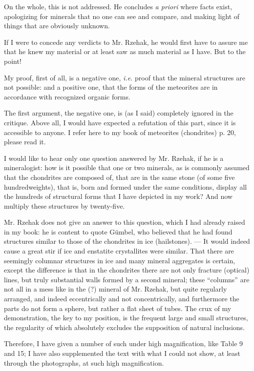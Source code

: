 \documentclass[a4paper, 12pt, oneside]{article}
\begin{document}
On the whole, this is not addressed. He concludes \emph{a priori} where facts exist, apologizing for minerals that no one can see and compare, and making light of things that are obviously unknown.

If I were to concede any verdicts to Mr. Rzehak, he would first have to assure me that he knew my material or at least saw as much material as I have. But to the point!

My proof, first of all, is a negative one, \emph{i.e.} proof that the mineral structures are not possible: and a positive one, that the forms of the meteorites are in accordance with recognized organic forms.

The first argument, the negative one, is (as I said) completely ignored in the critique. Above all, I would have expected a refutation of this part, since it is accessible to anyone. I refer here to my book of meteorites (chondrites) p. 20, please read it.

I would like to hear only one question answered by Mr. Rzehak, if he is a mineralogist: how is it possible that one or two minerals, as is commonly assumed that the chondrites are composed of, that are in the same stone (of some five hundredweights), that is, born and formed under the same conditions, display all the hundreds of structural forms that I have depicted in my work? And now multiply these structures by twenty-five.

Mr. Rzehak does not give an answer to this question, which I had already raised in my book: he is content to quote Gümbel, who believed that he had found structures similar to those of the chondrites in ice (hailstones). --- It would indeed cause a great stir if ice and enstatite crystallites were similar. That there are seemingly columnar structures in ice and many mineral aggregates is certain, except the difference is that in the chondrites there are not only fracture (optical) lines, but truly substantial walls formed by a second mineral; these ``columns'' are not all in a mess like in the (?) mineral of Mr. Rzehak, but quite regularly arranged, and indeed eccentrically and not concentrically, and furthermore the parts do not form a sphere, but rather a flat sheet of tubes. The crux of my demonstration, the key to my position, is the frequent large and small structures, the regularity of which absolutely excludes the supposition of natural inclusions.

Therefore, I have given a number of such under high magnification, like Table 9 and 15; I have also supplemented the text with what I could not show, at least through the photographs, at such high magnification.
\end{document}
